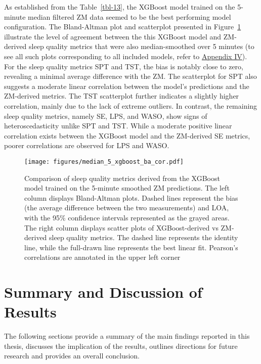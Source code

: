 \documentclass[
  10pt,
]{scrbook}
\begin{document}
As established from the Table~\ref{tbl-13}, the XGBoost model trained on
the 5-minute median filtered ZM data seemed to be the best performing
model configuration. The Bland-Altman plot and scatterplot presented in
Figure~\ref{fig-xgb_ba_cor} illustrate the level of agreement between
the this XGBoost model and ZM-derived sleep quality metrics that were
also median-smoothed over 5 minutes (to see all such plots corresponding
to all included models, refer to
\hyperref[app:paper3supp]{Appendix IV}). For the sleep quality metrics
SPT and TST, the bias is notably close to zero, revealing a minimal
average difference with the ZM. The scatterplot for SPT also suggests a
moderate linear correlation between the model's predictions and the
ZM-derived metrics. The TST scatterplot further indicates a slightly
higher correlation, mainly due to the lack of extreme outliers. In
contrast, the remaining sleep quality metrics, namely SE, LPS, and WASO,
show signs of heteroscedasticity unlike SPT and TST. While a moderate
positive linear correlation exists between the XGBoost model and the
ZM-derived SE metrics, poorer correlations are observed for LPS and
WASO.

\begin{figure}

{\centering \texttt{[image: figures/median\_5\_xgboost\_ba\_cor.pdf]}

}

\caption{\label{fig-xgb_ba_cor}Comparison of sleep quality metrics
derived from the XGBoost model trained on the 5-minute smoothed ZM
predictions. The left column displays Bland-Altman plots. Dashed lines
represent the bias (the average difference between the two measurements)
and LOA, with the 95\% confidence intervals represented as the grayed
areas. The right column displays scatter plots of XGBoost-derived vs
ZM-derived sleep quality metrics. The dashed line represents the
identity line, while the full-drawn line represents the best linear fit.
Pearson's correlations are annotated in the upper left corner}

\end{figure}

\hypertarget{summary-and-discussion-of-results}{%
\chapter{Summary and Discussion of
Results}\label{summary-and-discussion-of-results}}

The following sections provide a summary of the main findings reported
in this thesis, discusses the implication of the results, outlines
directions for future research and provides an overall conclusion.
\end{document}
